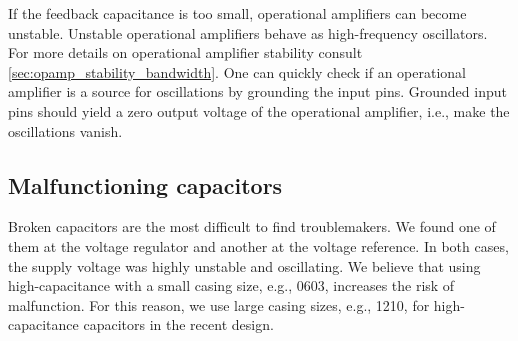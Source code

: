 If the feedback capacitance is too small, operational amplifiers can become unstable.
Unstable operational amplifiers behave as high-frequency oscillators.
For more details on operational amplifier stability consult \cref{sec:opamp_stability_bandwidth}.
One can quickly check if an operational amplifier is a source for oscillations by grounding the input pins.
Grounded input pins should yield a zero output voltage of the operational amplifier, i.e., make the oscillations vanish.

\subsection{Malfunctioning capacitors}

Broken capacitors are the most difficult to find troublemakers. 
We found one of them at the voltage regulator and another at the voltage reference.
In both cases, the supply voltage was highly unstable and oscillating.
We believe that using high-capacitance with a small casing size, e.g., 0603, increases the risk of malfunction.
For this reason, we use large casing sizes, e.g., 1210, for high-capacitance capacitors in the recent design.